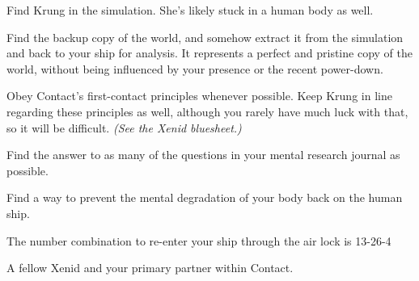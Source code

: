 \documentclass[char]{guildcamp1}
\begin{document}

\begin{itemz}[Goals]
  \item Find Krung in the simulation. She's likely stuck in a human body as well.
  \item Find the backup copy of the world, and somehow extract it from the simulation and back to your ship for analysis. It represents a perfect and pristine copy of the world, without being influenced by your presence or the recent power-down.
  \item Obey Contact's first-contact principles whenever possible. Keep Krung in line regarding these principles as well, although you rarely have much luck with that, so it will be difficult. \emph{(See the Xenid bluesheet.)}
  \item Find the answer to as many of the questions in your mental research journal as possible.
  \item Find a way to prevent the mental degradation of your body back on the human ship.
  
\end{itemz}

\begin{itemz}[Notes]
  \item The number combination to re-enter your ship through the air lock is 13-26-4
\end{itemz}

\begin{contacts}
   A fellow Xenid and your primary partner within Contact.
\end{contacts}



\endtag
\end{document}

